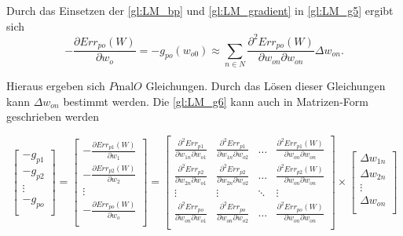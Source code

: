 Durch das Einsetzen der \autoref{gl:LM_bp} und \autoref{gl:LM_gradient} in \autoref{gl:LM_g5} ergibt sich
\begin{equation}
-\frac{\partial Err_{po}(W)}{\partial w_{o}}  = -g_{po}(w_{o0}) \approx \sum\limits_{n \in N} \frac{\partial^2 Err_{po}(W)}{\partial w_{on} \partial w_{on}} \Delta w_{on} .
\label{gl:LM_g6}
\end{equation}

Hieraus ergeben sich $P \text{mal} O$ Gleichungen. Durch das Lösen dieser Gleichungen kann $\Delta w_{on}$ bestimmt werden. Die \autoref{gl:LM_g6} kann auch in Matrizen-Form geschrieben werden

\begin{equation}
 \begin{bmatrix}
  -g_{p1}   \\
  -g_{p2}   \\
  \vdots    \\
  -g_{po}   \\ 
 \end{bmatrix}
 =
  \begin{bmatrix}
  -\frac{\partial Err_{p1}(W)}{\partial w_{1}}   \\
  -\frac{\partial Err_{p2}(W)}{\partial w_{2}}   \\
  \vdots    \\
  -\frac{\partial Err_{po}(W)}{\partial w_{o}}   \\ 
 \end{bmatrix}
 =
 \begin{bmatrix}
    \frac{\partial^2 Err_{p1}}{\partial w_{1n} \partial w_{o1}} & \frac{\partial^2 Err_{p1}}{\partial w_{1n} \partial w_{o2}}  & \dots  & \frac{\partial^2 Err_{p1}(W)}{\partial w_{on} \partial w_{on}} \\
    \frac{\partial^2 Err_{p2}}{\partial w_{2n} \partial w_{o1}} & \frac{\partial^2 Err_{p2}}{\partial w_{2n} \partial w_{o2}}  & \dots  & \frac{\partial^2 Err_{p2}(W)}{\partial w_{on} \partial w_{on}} \\
    \vdots & \vdots & \ddots & \vdots \\
    \frac{\partial^2 Err_{po}}{\partial w_{on} \partial w_{o1}} & \frac{\partial^2 Err_{po}}{\partial w_{on} \partial w_{o2}}  & \dots  & \frac{\partial^2 Err_{po}(W)}{\partial w_{on} \partial w_{on}} \\
 \end{bmatrix}
\times
 \begin{bmatrix}
  \Delta w_{1n}  \\
  \Delta w_{2n}  \\
  \vdots    \\
  \Delta w_{on}   \\ 
 \end{bmatrix}
\label{gl:LM_matrix-schreibweise}
\end{equation}

